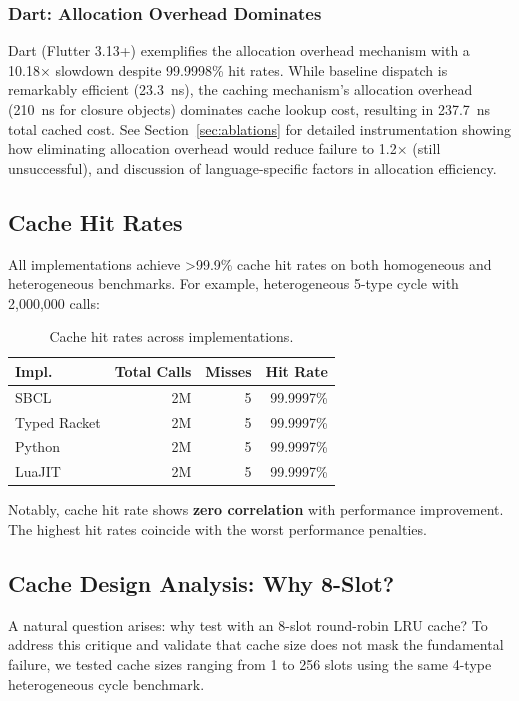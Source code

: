 \documentclass[sigplan,final,acmsmall,review,screen]{acmart}
\begin{document}
\subsubsection{Dart: Allocation Overhead Dominates}

Dart (Flutter 3.13+) exemplifies the allocation overhead mechanism with a 10.18× slowdown despite 99.9998\% hit rates.
While baseline dispatch is remarkably efficient (23.3~ns), the caching mechanism's allocation overhead
(210~ns for closure objects) dominates cache lookup cost, resulting in 237.7~ns total cached cost.
See Section~\ref{sec:ablations} for detailed instrumentation showing how eliminating allocation overhead
would reduce failure to 1.2× (still unsuccessful), and discussion of language-specific factors in allocation efficiency.

\subsection{Cache Hit Rates}

All implementations achieve >99.9\% cache hit rates on both homogeneous and heterogeneous
benchmarks. For example, heterogeneous 5-type cycle with 2,000,000 calls:

\begin{table}[h!]
\centering
\small
\caption{Cache hit rates across implementations.}
\label{tab:hit-rates}
\begin{tabular}{@{}lrrr@{}}
\toprule
\textbf{Impl.} & \textbf{Total Calls} & \textbf{Misses} & \textbf{Hit Rate} \\
\midrule
SBCL & 2M & 5 & 99.9997\% \\
Typed Racket & 2M & 5 & 99.9997\% \\
Python & 2M & 5 & 99.9997\% \\
LuaJIT & 2M & 5 & 99.9997\% \\
\bottomrule
\end{tabular}
\end{table}

Notably, cache hit rate shows \textbf{zero correlation} with performance improvement. The
highest hit rates coincide with the worst performance penalties.

\subsection{Cache Design Analysis: Why 8-Slot?}
\label{sec:cache-design}

A natural question arises: why test with an 8-slot round-robin LRU cache? To address this critique
and validate that cache size does not mask the fundamental failure, we tested cache sizes ranging
from 1 to 256 slots using the same 4-type heterogeneous cycle benchmark.
\end{document}
